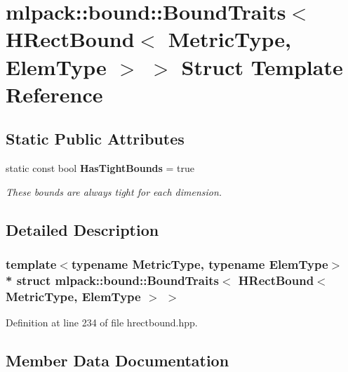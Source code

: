 \section{mlpack\+:\+:bound\+:\+:Bound\+Traits$<$ H\+Rect\+Bound$<$ Metric\+Type, Elem\+Type $>$ $>$ Struct Template Reference}
\label{structmlpack_1_1bound_1_1BoundTraits_3_01HRectBound_3_01MetricType_00_01ElemType_01_4_01_4}
\subsection*{Static Public Attributes}
\begin{DoxyCompactItemize}
\item 
static const bool {\bf Has\+Tight\+Bounds} = true
\begin{DoxyCompactList}\small\item\em These bounds are always tight for each dimension. \end{DoxyCompactList}\end{DoxyCompactItemize}


\subsection{Detailed Description}
\subsubsection*{template$<$typename Metric\+Type, typename Elem\+Type$>$\\*
struct mlpack\+::bound\+::\+Bound\+Traits$<$ H\+Rect\+Bound$<$ Metric\+Type, Elem\+Type $>$ $>$}



Definition at line 234 of file hrectbound.\+hpp.



\subsection{Member Data Documentation}
